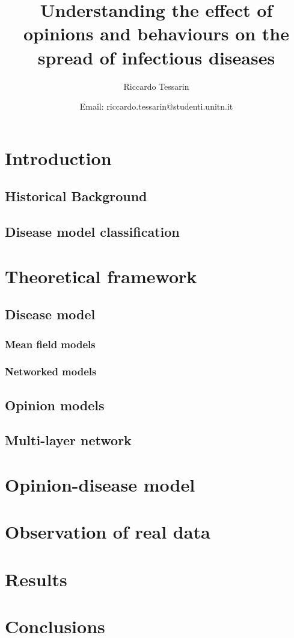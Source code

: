 \documentclass[a4paper,11pt]{scrartcl}
\title{Understanding the effect of opinions and behaviours on the spread of infectious diseases}
\subtitle{ }
\author{Riccardo Tessarin}
\date{ Email: riccardo.tessarin@studenti.unitn.it }
\begin{document}
	
	\maketitle
	\tableofcontents
	\pagebreak
	
	
	
	\section{Introduction}
		\subsection{Historical Background}
		\subsection{Disease model classification}
	
	\section{Theoretical framework}
		\subsection{Disease model}
			\subsubsection{Mean field models}
			\subsubsection{Networked models}
		\subsection{Opinion models}
		\subsection{Multi-layer network}
	\section{Opinion-disease model }
	
	\section{Observation of real data}
	
	\section{Results}
	
	\section{Conclusions}
	
\end{document}
